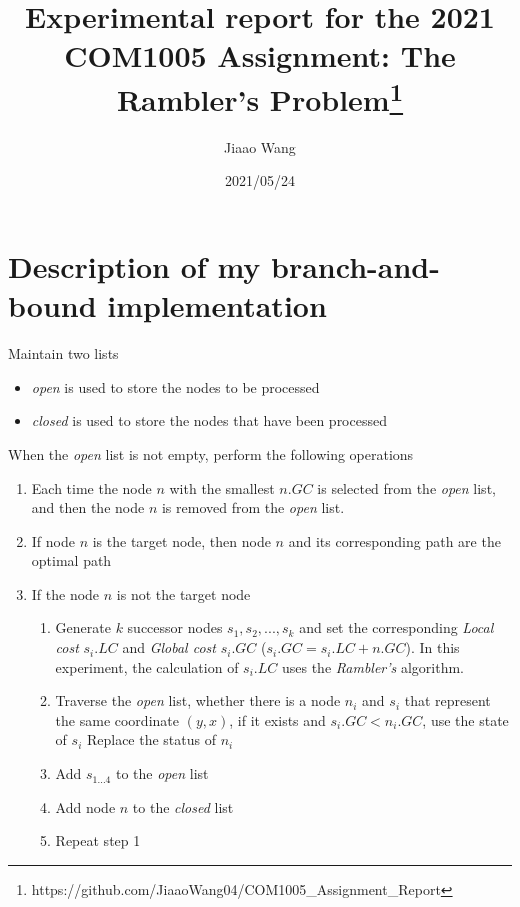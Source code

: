 \documentclass[
]{article}
\title{Experimental report for the 2021 COM1005 Assignment: The Rambler's Problem\footnote{https://github.com/JiaaoWang04/COM1005_Assignment_Report}}
\author{Jiaao Wang}
\date{2021/05/24}
\begin{document}
\maketitle

\section{Description of my branch-and-bound implementation}

Maintain two lists

\begin{itemize}
\item
  \emph{open} is used to store the nodes to be processed
\item
  \emph{closed} is used to store the nodes that have been processed
\end{itemize}

When the \emph{open} list is not empty, perform the following operations

\begin{enumerate}
\def\labelenumi{\arabic{enumi}.}
\item
  Each time the node \(n\) with the smallest \(n.GC\) is selected from
  the \emph{open} list, and then the node \(n\) is removed from the
  \emph{open} list.
\item
  If node \(n\) is the target node, then node \(n\) and its
  corresponding path are the optimal path
\item
  If the node \(n\) is not the target node

  \begin{enumerate}
  \def\labelenumii{\arabic{enumii}.}
  \item
    Generate \(k\) successor nodes \(s_1, s_2, ..., s_k\) and set the
    corresponding \emph{Local cost} \(s_i.LC\) and \emph{Global cost}
    \(s_i.GC\) (\(s_i.GC = s_i. LC + n.GC\)). In this experiment, the
    calculation of \(s_i.LC\) uses the \emph{Rambler's} algorithm.
  \item
    Traverse the \emph{open} list, whether there is a node \(n_i\) and
    \(s_i\) that represent the same coordinate \((y, x)\), if it exists
    and \(s_i.GC <n_i.GC\), use the state of \(s_i\) Replace the status
    of \(n_i\)
  \item
    Add \(s_{1...4}\) to the \emph{open} list
  \item
    Add node \(n\) to the \emph{closed} list
  \item
    Repeat step 1
  \end{enumerate}
\end{enumerate}
\end{document}
